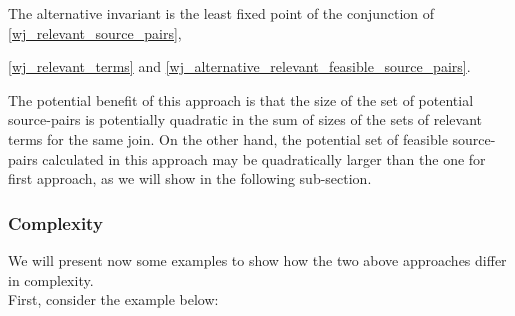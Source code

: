 The alternative invariant is the least fixed point of the conjunction of \ref{wj_relevant_source_pairs},

\ref{wj_relevant_terms} and \ref{wj_alternative_relevant_feasible_source_pairs}.

The potential benefit of this approach is that the size of the set of potential source-pairs is potentially 
quadratic in the sum of sizes of the sets of relevant terms for the same join. 
On the other hand, the potential set of feasible source-pairs calculated in this approach may be quadratically larger than the one for first approach, as we will show in the following sub-section.

\subsubsection{Complexity}
We will present now some examples to show how the two above approaches differ in complexity.\\
First, consider the example below:
